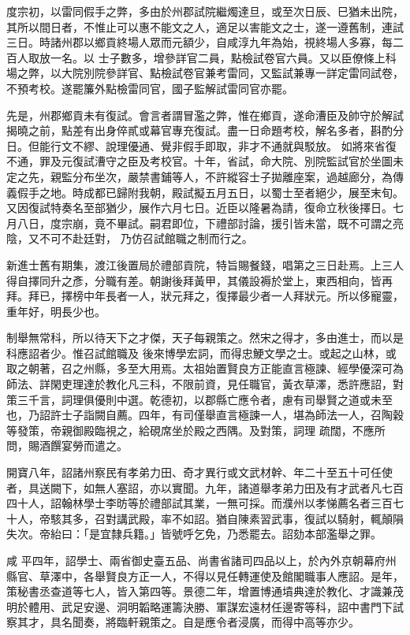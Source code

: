 \begin{pinyinscope}
 度宗初，以雷同假手之弊，多由於州郡試院繼燭達旦，或至次日辰、巳猶未出院，其所以間日者，不惟止可以惠不能文之人，適足以害能文之士，遂一遵舊制，連試三日。時諸州郡以鄉貢終場人眾而元額少，自咸淳九年為始，視終場人多寡，每二百人取放一名。以
 士子數多，增參詳官二員，點檢試卷官六員。又以臣僚條上科場之弊，以大院別院參詳官、點檢試卷官兼考雷同，又監試兼專一詳定雷同試卷，不預考校。遂罷簾外點檢雷同官，國子監解試雷同官亦罷。



 先是，州郡鄉貢未有復試。會言者謂冒濫之弊，惟在鄉貢，遂命漕臣及帥守於解試揭曉之前，點差有出身倅貳或幕官專充復試。盡一日命題考校，解名多者，斟酌分日。但能行文不繆、說理優通、覺非假手即取，非才不通就與駁放。
 如將來省復不通，罪及元復試漕守之臣及考校官。十年，省試，命大院、別院監試官於坐圖未定之先，親監分布坐次，嚴禁書鋪等人，不許縱容士子拋離座案，過越廊分，為傳義假手之地。時成都已歸附我朝，殿試擬五月五日，以蜀士至者絕少，展至末旬。又因復試特奏名至部猶少，展作六月七日。近臣以隆暑為請，復命立秋後擇日。七月八日，度宗崩，竟不畢試。嗣君即位，下禮部討論，援引皆未當，既不可謂之亮陰，又不可不赴廷對，
 乃仿召試館職之制而行之。



 新進士舊有期集，渡江後置局於禮部貢院，特旨賜餐錢，唱第之三日赴焉。上三人得自擇同升之彥，分職有差。朝謝後拜黃甲，其儀設褥於堂上，東西相向，皆再拜。拜已，擇榜中年長者一人，狀元拜之，復擇最少者一人拜狀元。所以侈寵靈，重年好，明長少也。



 制舉無常科，所以待天下之才傑，天子每親策之。然宋之得才，多由進士，而以是科應詔者少。惟召試館職及
 後來博學宏詞，而得忠鯁文學之士。或起之山林，或取之朝著，召之州縣，多至大用焉。太祖始置賢良方正能直言極諫、經學優深可為師法、詳閑吏理達於教化凡三科，不限前資，見任職官，黃衣草澤，悉許應詔，對策三千言，詞理俱優則中選。乾德初，以郡縣亡應令者，慮有司舉賢之道或未至也，乃詔許士子詣闕自薦。四年，有司僅舉直言極諫一人，堪為師法一人，召陶穀等發策，帝親御殿臨視之，給硯席坐於殿之西隅。及對策，詞理
 疏闊，不應所問，賜酒饌宴勞而遣之。



 開寶八年，詔諸州察民有孝弟力田、奇才異行或文武材幹、年二十至五十可任使者，具送闕下，如無人塞詔，亦以實聞。九年，諸道舉孝弟力田及有才武者凡七百四十人，詔翰林學士李昉等於禮部試其業，一無可採。而濮州以孝悌薦名者三百七十人，帝駭其多，召對講武殿，率不如詔。猶自陳素習武事，復試以騎射，輒顛隕失次。帝紿曰：「是宜隸兵籍。」皆號呼乞免，乃悉罷去。詔劾本部濫舉之罪。



 咸
 平四年，詔學士、兩省御史臺五品、尚書省諸司四品以上，於內外京朝幕府州縣官、草澤中，各舉賢良方正一人，不得以見任轉運使及館閣職事人應詔。是年，策秘書丞查道等七人，皆入第四等。景德二年，增置博通墳典達於教化、才識兼茂明於體用、武足安邊、洞明韜略運籌決勝、軍謀宏遠材任邊寄等科，詔中書門下試察其才，具名聞奏，將臨軒親策之。自是應令者浸廣，而得中高等亦少。




\end{pinyinscope}
